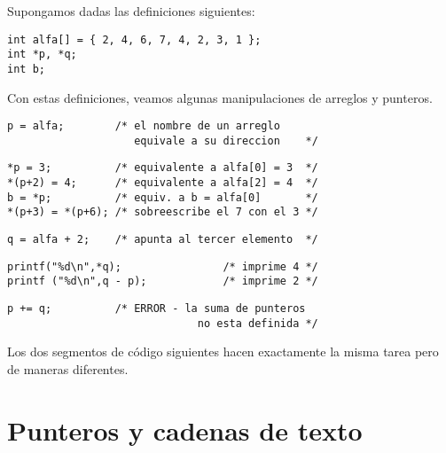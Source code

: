 \begin{ejemplo}
Supongamos dadas las definiciones siguientes:
\begin{lstlisting}
int alfa[] = { 2, 4, 6, 7, 4, 2, 3, 1 };
int *p, *q;
int b;
\end{lstlisting}
Con estas definiciones, veamos algunas manipulaciones de arreglos y punteros. 

\begin{lstlisting}
p = alfa;        /* el nombre de un arreglo
                    equivale a su direccion    */
\end{lstlisting}

\begin{lstlisting}
*p = 3;          /* equivalente a alfa[0] = 3  */
*(p+2) = 4;      /* equivalente a alfa[2] = 4  */
b = *p;          /* equiv. a b = alfa[0]       */
*(p+3) = *(p+6); /* sobreescribe el 7 con el 3 */
\end{lstlisting}

\begin{lstlisting}
q = alfa + 2;    /* apunta al tercer elemento  */
\end{lstlisting}

\begin{lstlisting}
printf("%d\n",*q);                /* imprime 4 */
printf ("%d\n",q - p);            /* imprime 2 */
\end{lstlisting}

\begin{lstlisting}
p += q;          /* ERROR - la suma de punteros
                              no esta definida */
\end{lstlisting}
Los dos segmentos de código siguientes hacen exactamente la misma tarea pero de maneras diferentes.

\end{ejemplo}


\section{Punteros y cadenas de texto}

